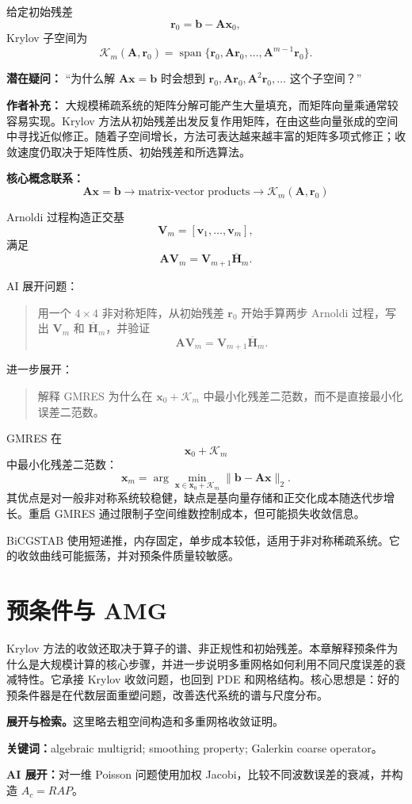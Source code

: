 \documentclass[11pt,openany]{ctexbook}
\newcommand{\Ksp}{\mathcal K}
\newcommand{\studyroute}[3]{%
  \par\smallskip\noindent\textbf{展开与检索。}#1\par
  \noindent\textbf{关键词：}#2。\par
  \noindent\textbf{AI 展开：}#3\par
}
\begin{document}
给定初始残差
\[
\bm r_0=\bm b-\bm A\bm x_0,
\]
Krylov 子空间为
\[
\Ksp_m(\bm A,\bm r_0)
=
\operatorname{span}
\{
\bm r_0,\bm A\bm r_0,\dots,\bm A^{m-1}\bm r_0
\}.
\]

\begin{authornote}
\textbf{潜在疑问：}
“为什么解 \(\bm A\bm x=\bm b\) 时会想到 \(\bm r_0,\bm A\bm r_0,\bm A^2\bm r_0,\dots\) 这个子空间？”

\textbf{作者补充：}
大规模稀疏系统的矩阵分解可能产生大量填充，而矩阵向量乘通常较容易实现。Krylov 方法从初始残差出发反复作用矩阵，在由这些向量张成的空间中寻找近似修正。随着子空间增长，方法可表达越来越丰富的矩阵多项式修正；收敛速度仍取决于矩阵性质、初始残差和所选算法。

\textbf{核心概念联系：}
\[
\bm A\bm x=\bm b
\longrightarrow
\text{matrix-vector products}
\longrightarrow
\Ksp_m(\bm A,\bm r_0)
\]
\end{authornote}

Arnoldi 过程构造正交基
\[
\bm V_m=[\bm v_1,\dots,\bm v_m],
\]
满足
\[
\bm A\bm V_m
=
\bm V_{m+1}\overline{\bm H}_m.
\]

\begin{askai}
AI 展开问题：
\begin{quote}
用一个 \(4\times4\) 非对称矩阵，从初始残差 \(\bm r_0\) 开始手算两步 Arnoldi 过程，写出 \(\bm V_m\) 和 \(\overline{\bm H}_m\)，并验证
\[
\bm A\bm V_m=\bm V_{m+1}\overline{\bm H}_m.
\]
\end{quote}

进一步展开：
\begin{quote}
解释 GMRES 为什么在 \(\bm x_0+\Ksp_m\) 中最小化残差二范数，而不是直接最小化误差二范数。
\end{quote}
\end{askai}

GMRES 在
\[
\bm x_0+\Ksp_m
\]
中最小化残差二范数：
\[
\bm x_m
=
\arg\min_{\bm x\in\bm x_0+\Ksp_m}
\|\bm b-\bm A\bm x\|_2.
\]
其优点是对一般非对称系统较稳健，缺点是基向量存储和正交化成本随迭代步增长。重启 GMRES 通过限制子空间维数控制成本，但可能损失收敛信息。

BiCGSTAB 使用短递推，内存固定，单步成本较低，适用于非对称稀疏系统。它的收敛曲线可能振荡，并对预条件质量较敏感。

\chapter{预条件与 AMG}

\begin{chaptersummary}
Krylov 方法的收敛还取决于算子的谱、非正规性和初始残差。本章解释预条件为什么是大规模计算的核心步骤，并进一步说明多重网格如何利用不同尺度误差的衰减特性。它承接 Krylov 收敛问题，也回到 PDE 和网格结构。核心思想是：好的预条件器是在代数层面重塑问题，改善迭代系统的谱与尺度分布。
\end{chaptersummary}
\studyroute{这里略去粗空间构造和多重网格收敛证明。}{algebraic multigrid; smoothing property; Galerkin coarse operator}{对一维 Poisson 问题使用加权 Jacobi，比较不同波数误差的衰减，并构造 $A_c=RAP$。}
\end{document}
